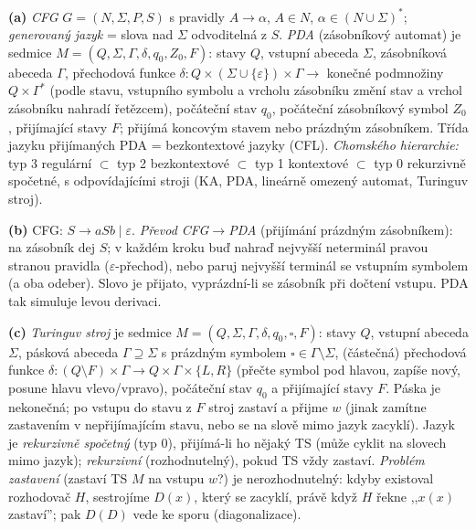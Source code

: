 \begin{reseni}
\textbf{(a)} \emph{CFG} $G=(N,\Sigma,P,S)$ s pravidly $A\to\alpha$, $A\in N$, $\alpha\in(N\cup\Sigma)^*$; \emph{generovaný jazyk} = slova nad $\Sigma$ odvoditelná z $S$. \emph{PDA} (zásobníkový automat) je sedmice $M=(Q,\Sigma,\Gamma,\delta,q_0,Z_0,F)$: stavy $Q$, vstupní abeceda $\Sigma$, zásobníková abeceda $\Gamma$, přechodová funkce $\delta:Q\times(\Sigma\cup\{\varepsilon\})\times\Gamma\to$ konečné podmnožiny $Q\times\Gamma^*$ (podle stavu, vstupního symbolu a vrcholu zásobníku změní stav a vrchol zásobníku nahradí řetězcem), počáteční stav $q_0$, počáteční zásobníkový symbol $Z_0$, přijímající stavy $F$; přijímá koncovým stavem nebo prázdným zásobníkem. Třída jazyku přijímaných PDA = bezkontextové jazyky (CFL). \emph{Chomského hierarchie:} typ 3 regulární $\subset$ typ 2 bezkontextové $\subset$ typ 1 kontextové $\subset$ typ 0 rekurzivně spočetné, s odpovídajícími stroji (KA, PDA, lineárně omezený automat, Turinguv stroj).

\textbf{(b)} CFG: $S\to aSb \mid \varepsilon$. \emph{Převod CFG$\to$PDA} (přijímání prázdným zásobníkem): na zásobník dej $S$; v každém kroku buď nahraď nejvyšší neterminál pravou stranou pravidla ($\varepsilon$-přechod), nebo paruj nejvyšší terminál se vstupním symbolem (a oba odeber). Slovo je přijato, vyprázdní-li se zásobník při dočtení vstupu. PDA tak simuluje levou derivaci.

\textbf{(c)} \emph{Turinguv stroj} je sedmice $M=(Q,\Sigma,\Gamma,\delta,q_0,\square,F)$: stavy $Q$, vstupní abeceda $\Sigma$, pásková abeceda $\Gamma\supseteq\Sigma$ s prázdným symbolem $\square\in\Gamma\setminus\Sigma$, (částečná) přechodová funkce $\delta:(Q\setminus F)\times\Gamma\to Q\times\Gamma\times\{L,R\}$ (přečte symbol pod hlavou, zapíše nový, posune hlavu vlevo/vpravo), počáteční stav $q_0$ a přijímající stavy $F$. Páska je nekonečná; po vstupu do stavu z $F$ stroj zastaví a přijme $w$ (jinak zamítne zastavením v nepřijímajícím stavu, nebo se na slově mimo jazyk zacyklí). Jazyk je \emph{rekurzivně spočetný} (typ 0), přijímá-li ho nějaký TS (může cyklit na slovech mimo jazyk); \emph{rekurzivní} (rozhodnutelný), pokud TS vždy zastaví. \emph{Problém zastavení} (zastaví TS $M$ na vstupu $w$?) je nerozhodnutelný: kdyby existoval rozhodovač $H$, sestrojíme $D(x)$, který se zacyklí, právě když $H$ řekne ,,$x(x)$ zastaví''; pak $D(D)$ vede ke sporu (diagonalizace).
\end{reseni}

